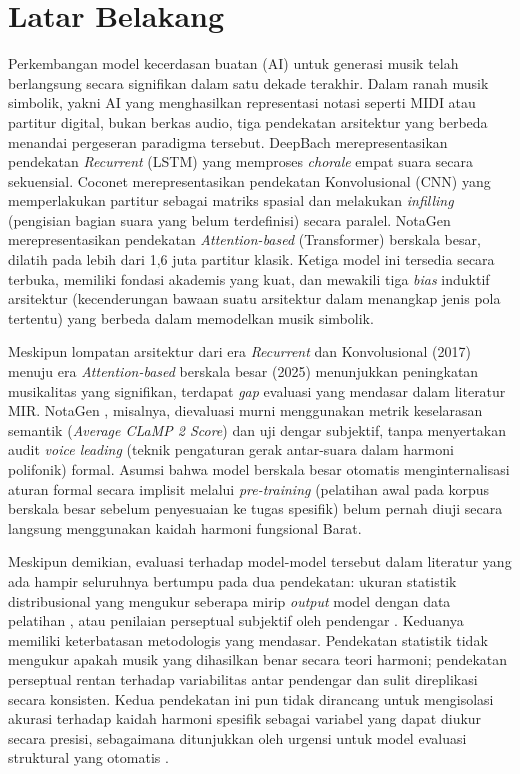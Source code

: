 \section{Latar Belakang}

Perkembangan model kecerdasan buatan (AI) untuk generasi musik telah berlangsung secara signifikan dalam satu dekade terakhir. Dalam ranah musik simbolik, yakni AI yang menghasilkan representasi notasi seperti MIDI atau partitur digital, bukan berkas audio, tiga pendekatan arsitektur yang berbeda menandai pergeseran paradigma tersebut. DeepBach \parencite{hadjeres2017} merepresentasikan pendekatan \textit{Recurrent} (LSTM) yang memproses \textit{chorale} empat suara secara sekuensial. Coconet \parencite{huang2017} merepresentasikan pendekatan Konvolusional (CNN) yang memperlakukan partitur sebagai matriks spasial dan melakukan \textit{infilling} (pengisian bagian suara yang belum terdefinisi) secara paralel. NotaGen \parencite{wang2025} merepresentasikan pendekatan \textit{Attention-based} (Transformer) berskala besar, dilatih pada lebih dari 1,6 juta partitur klasik. Ketiga model ini tersedia secara terbuka, memiliki fondasi akademis yang kuat, dan mewakili tiga \textit{bias} induktif arsitektur (kecenderungan bawaan suatu arsitektur dalam menangkap jenis pola tertentu) yang berbeda dalam memodelkan musik simbolik.

Meskipun lompatan arsitektur dari era \textit{Recurrent} dan Konvolusional (2017) menuju era \textit{Attention-based} berskala besar (2025) menunjukkan peningkatan musikalitas yang signifikan, terdapat \textit{gap} evaluasi yang mendasar dalam literatur MIR. NotaGen \parencite{wang2025}, misalnya, dievaluasi murni menggunakan metrik keselarasan semantik (\textit{Average CLaMP 2 Score}) dan uji dengar subjektif, tanpa menyertakan audit \textit{voice leading} (teknik pengaturan gerak antar-suara dalam harmoni polifonik) formal. Asumsi bahwa model berskala besar otomatis menginternalisasi aturan formal secara implisit melalui \textit{pre-training} (pelatihan awal pada korpus berskala besar sebelum penyesuaian ke tugas spesifik) belum pernah diuji secara langsung menggunakan kaidah harmoni fungsional Barat.

Meskipun demikian, evaluasi terhadap model-model tersebut dalam literatur yang ada hampir seluruhnya bertumpu pada dua pendekatan: ukuran statistik distribusional yang mengukur seberapa mirip \textit{output} model dengan data pelatihan \parencite{Retkowski2024}, atau penilaian perseptual subjektif oleh pendengar \parencite{yang2020}. Keduanya memiliki keterbatasan metodologis yang mendasar. Pendekatan statistik tidak mengukur apakah musik yang dihasilkan benar secara teori harmoni; pendekatan perseptual rentan terhadap variabilitas antar pendengar dan sulit direplikasi secara konsisten. Kedua pendekatan ini pun tidak dirancang untuk mengisolasi akurasi terhadap kaidah harmoni spesifik sebagai variabel yang dapat diukur secara presisi, sebagaimana ditunjukkan oleh urgensi untuk model evaluasi struktural yang otomatis \parencite{DeBerardinis2022}.

